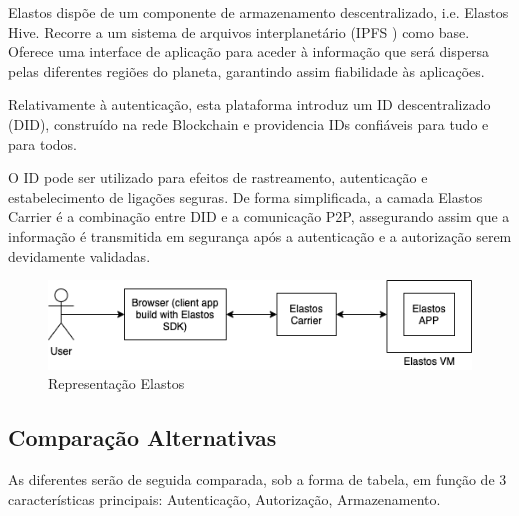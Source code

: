 Elastos dispõe de um componente de armazenamento descentralizado, i.e. Elastos Hive. Recorre a um sistema de arquivos interplanetário (IPFS \label{sym:IPFS}) \cite{ipfs} como base. Oferece uma interface de aplicação para aceder à informação que será dispersa pelas diferentes regiões do planeta, garantindo assim fiabilidade às aplicações.\cite{elastos_white_paper}

Relativamente à autenticação, esta plataforma introduz um ID descentralizado (DID), construído na rede Blockchain e providencia IDs confiáveis para tudo e para todos. 

O ID pode ser utilizado para efeitos de rastreamento, autenticação e estabelecimento de ligações seguras. De forma simplificada, a camada Elastos Carrier é a combinação entre DID e a comunicação P2P, assegurando assim que a informação é transmitida em segurança após a autenticação e a autorização serem devidamente validadas.\cite{elastos_white_paper}

\begin{figure}[H]
    \begin{center}
    \includegraphics[width=1\textwidth]{figures/estado_arte-Elastos.png}
    \caption{Representação Elastos}
    \end{center}
\end{figure}

\subsection{Comparação Alternativas}

As diferentes serão de seguida comparada, sob a forma de tabela, em função de 3 características principais: Autenticação, Autorização, Armazenamento.



